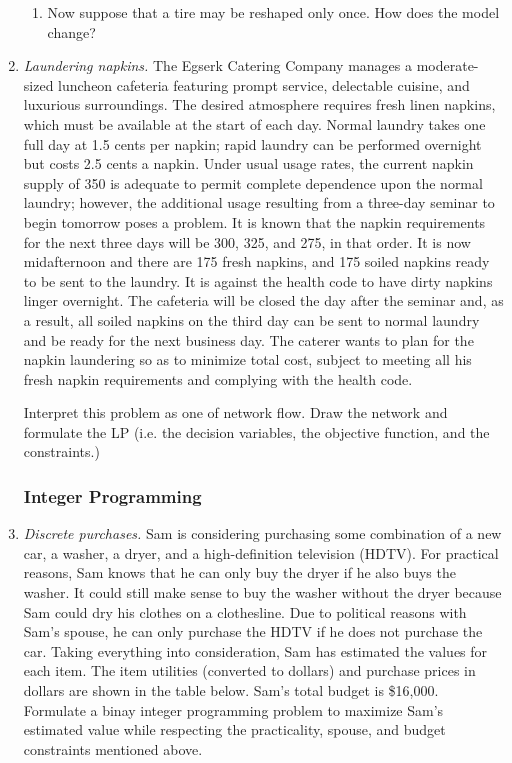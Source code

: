 \begin{enumerate}
\begin{enumerate}
\item Now suppose that a tire may be reshaped only once. How does the
  model change?
\end{enumerate}

\item \emph{Laundering napkins.} The Egserk Catering Company manages a
  moderate-sized luncheon cafeteria featuring prompt service,
  delectable cuisine, and luxurious surroundings. The desired
  atmosphere requires fresh linen napkins, which must be available at
  the start of each day. Normal laundry takes one full day at 1.5
  cents per napkin; rapid laundry can be performed overnight but costs
  2.5 cents a napkin. Under usual usage rates, the current napkin
  supply of 350 is adequate to permit complete dependence upon the
  normal laundry; however, the additional usage resulting from a
  three-day seminar to begin tomorrow poses a problem. It is known
  that the napkin requirements for the next three days will be 300,
  325, and 275, in that order. It is now midafternoon and there are
  175 fresh napkins, and 175 soiled napkins ready to be sent to the
  laundry. It is against the health code to have dirty napkins linger
  overnight. The cafeteria will be closed the day after the seminar
  and, as a result, all soiled napkins on the third day can be sent to
  normal laundry and be ready for the next business day.  The caterer
  wants to plan for the napkin laundering so as to minimize total
  cost, subject to meeting all his fresh napkin requirements and
  complying with the health code.

  Interpret this problem as one of network flow.  Draw the network and
  formulate the LP (i.e. the decision variables, the objective
  function, and the constraints.)

\subsubsection*{Integer Programming}
\item \emph{Discrete purchases.} Sam is considering purchasing some
  combination of a new car, a washer, a dryer, and a high-definition
  television (HDTV). For practical reasons, Sam knows that he can only
  buy the dryer if he also buys the washer. It could still make sense
  to buy the washer without the dryer because Sam could dry his
  clothes on a clothesline. Due to political reasons with Sam's
  spouse, he can only purchase the HDTV if he does not purchase the
  car. Taking everything into consideration, Sam has estimated the
  values for each item. The item utilities (converted to dollars) and
  purchase prices in dollars are shown in the table below.  Sam's
  total budget is \$16,000. Formulate a binay integer programming
  problem to maximize Sam's estimated value while respecting the
  practicality, spouse, and budget constraints mentioned above.


\end{enumerate}
